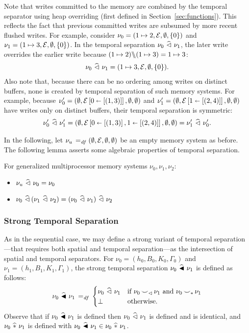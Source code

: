 \documentclass[11pt]{report}
\begin{document}
Note that writes committed to the memory are combined by the temporal separator using heap overriding (first defined in Section~\ref{sec:functions}). This reflects the fact that previous committed writes are subsumed by more recent flushed writes. For example, consider $\nu_0 = (1 \mapsto 2,\arnil,\nil,\set{0})$ and $\nu_1 = (1 \mapsto 3, \arnil, \nil, \set{0})$. In the temporal separation $\nu_0 \mseq \nu_1$, the later write overrides the earlier write because $(1 \mapsto 2) \override (1\mapsto 3) = 1 \mapsto 3$: \[ \nu_0 \mseq \nu_1 = (1 \mapsto 3, \arnil, \nil, \set{0}).\] Also note that, because there can be no ordering among writes on distinct buffers, none is created by temporal separation of such memory systems. For example, because $\nu'_0 = (\nil,\funup{\arnil}{\ptup{0}{\llit{(1,3)}}},\nil,\nil)$ and $\nu'_1 = (\nil,\funup{\arnil}{\ptup{1}{\llit{(2,4)}}},\nil,\nil)$ have writes only on distinct buffers, their temporal separation is symmetric: \[ \nu'_0 \mseq \nu'_1 = (\nil,\funup{\arnil}{\ptup{0}{\llit{(1,3)}},\ptup{1}{\llit{(2,4)}}},\nil,\nil) = \nu'_1 \mseq \nu'_0.\]

In the following, let $\nu_u \eqdef (\nil, \arnil, \nil, \nil)$ be an empty memory system as before. The following lemma asserts some algebraic properties of temporal separation. \begin{lemma}
  \label{lem:temporal-separation-algebra}
  For generalized multiprocessor memory systems $\nu_0, \nu_1, \nu_2$: 
  \begin{itemize}
    \item $\nu_u \mseq \nu_0 = \nu_0$
    \item $\nu_0 \mseq (\nu_1 \mseq \nu_2) = (\nu_0 \mseq \nu_1) \mseq \nu_2$
  \end{itemize}
\end{lemma}

\subsubsection{Strong Temporal Separation}

As in the sequential case, we may define a strong variant of temporal separation---that requires both spatial and temporal separation---as the intersection of spatial and temporal separators. For $\nu_0 = (h_0,B_0,K_0,\Gamma_0)$ and $\nu_1 = (h_1,B_1,K_1,\Gamma_1)$, the strong temporal separation $\nu_0 \msseq \nu_1$ is defined as follows: \[ \nu_0 \msseq \nu_1 \eqdef \begin{cases}
  \nu_0 \mseq \nu_1 & \text{if $\nu_0 \compat_\seqsym \nu_1$ and $\nu_0 \compat_\sepsym \nu_1$} \\ 
  \bot & \text{otherwise.}
\end{cases}\] Observe that if $\nu_0 \msseq \nu_1$ is defined then $\nu_0 \mseq \nu_1$ is defined and is identical, and $\nu_0 \msep \nu_1$ is defined with $\nu_0 \msseq \nu_1 \in \nu_0 \msep \nu_1$.
\end{document}
